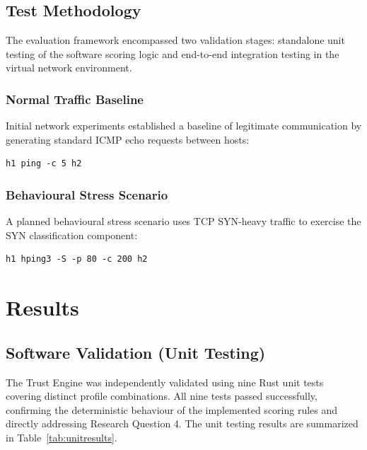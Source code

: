 \documentclass[conference]{IEEEtran}
\begin{document}
\subsection{Test Methodology}
The evaluation framework encompassed two validation stages: standalone unit testing of the software scoring logic and end-to-end integration testing in the virtual network environment.

\subsubsection{Normal Traffic Baseline}
Initial network experiments established a baseline of legitimate communication by generating standard ICMP echo requests between hosts:
\begin{verbatim}
h1 ping -c 5 h2
\end{verbatim}

\subsubsection{Behavioural Stress Scenario}
A planned behavioural stress scenario uses TCP SYN-heavy traffic to exercise the SYN classification component:
\begin{verbatim}
h1 hping3 -S -p 80 -c 200 h2
\end{verbatim}


\section{Results}

\subsection{Software Validation (Unit Testing)}
The Trust Engine was independently validated using nine Rust unit tests covering distinct profile combinations. All nine tests passed successfully, confirming the deterministic behaviour of the implemented scoring rules and directly addressing Research Question 4. The unit testing results are summarized in Table~\ref{tab:unitresults}.
\end{document}
